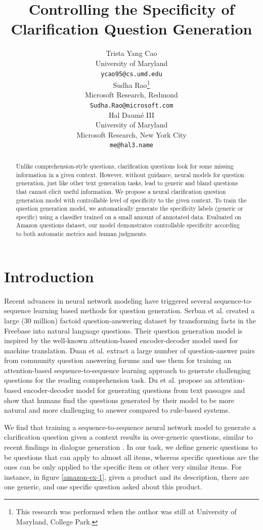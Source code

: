 \documentclass[11pt]{article}
\title{Controlling the Specificity of Clarification Question Generation}
\author{Trista Yang Cao \\
University of Maryland \\
{\tt ycao95@cs.umd.edu} \\ \And
Sudha Rao\thanks{This research was performed when the author was still at University of Maryland, College Park.} \\
Microsoft Research, Redmond \\
{\tt Sudha.Rao@microsoft.com} \\ \And
Hal Daum\'e III \\
University of Maryland \\
Microsoft Research, New York City\\
{\tt me@hal3.name} }
\date{}
\begin{document}
\maketitle
\begin{abstract}
Unlike comprehension-style questions, clarification questions look for some missing information in a given context. 
However, without guidance, neural models for question generation, just like other text generation tasks, lead to generic and bland questions that cannot elicit useful information. 
We propose a neural clarification question generation model with controllable level of specificity to the given context. 
To train the question generation model, we automatically generate the specificity labels (generic or specific) using a classifier trained on a small amount of annotated data. 
Evaluated on Amazon questions dataset, our model demonstrates controllable specificity according to both automatic metrics and human judgments.

\end{abstract}


\section{Introduction}
\label{intro}
Recent advances in neural network modeling have triggered several sequence-to-sequence learning \cite{sutskever2014sequence} based methods for question generation.
Serban et al.  created a large (30 million) factoid question-answering dataset  by transforming facts in the Freebase into natural language questions. 
Their question generation model is inspired by the well-known attention-based encoder-decoder model \cite{luong2015effective} used for machine translation.
Duan et al.  extract a large number of question-answer pairs from community question answering forums and use them for training an attention-based sequence-to-sequence learning approach to generate challenging questions for the reading comprehension task.  
Du et al.  propose an attention-based encoder-decoder model for generating questions from text passages and show that humans find the questions generated by their model to be more natural and more challenging to answer compared to rule-based systems.  

We find that training a sequence-to-sequence neural network model to generate a clarification question given a context results in over-generic questions, similar to recent findings in dialogue generation \cite{li2016deep}. 
In our task, we define generic questions to be questions that can apply to almost all items, whereas specific questions are the ones can be only applied to the specific item or other very similar items. 
For instance, in figure \ref{amazon-ex-1}, given a product and its description, there are one generic, and one specific question asked about this product. 
\end{document}
